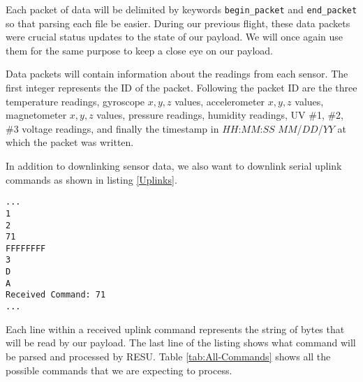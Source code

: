 Each packet of data will be delimited by keywords \verb|begin_packet| and \verb|end_packet| so that parsing each file be easier.  During our previous flight, these data packets were crucial status updates to the state of our payload.  We will once again use them for the same purpose to keep a close eye on our payload.

Data packets will contain information about the readings from each sensor.  The first integer represents the ID of the packet.  Following the packet ID are the three temperature readings, gyroscope $x, y, z$ values, accelerometer $x, y, z$ values, magnetometer $x, y, z$ values, pressure readings, humidity readings, UV \#1, \#2, \#3 voltage readings, and finally the timestamp in $HH$:$MM$:$SS$ $MM$/$DD$/$YY$ at which the packet was written.  

In addition to downlinking sensor data, we also want to downlink serial uplink commands as shown in listing \ref{Uplinks}.  

\lstset{basicstyle=\small, numbers=left, frame=tb, linewidth=11.5cm, xleftmargin=.4\textwidth, label = Uplinks}
\begin{lstlisting}[caption = Sample of received uplink commands in downlinked packets in SORA 2017~\cite{SORA}]
...
1
2
71
FFFFFFFF
3
D
A
Received Command: 71
...
\end{lstlisting}
\medskip

Each line within a received uplink command represents the string of bytes that will be read by our payload.  The last line of the listing shows what command will be parsed and processed by RESU.  Table \ref{tab:All-Commands} shows all the possible commands that we are expecting to process. 
